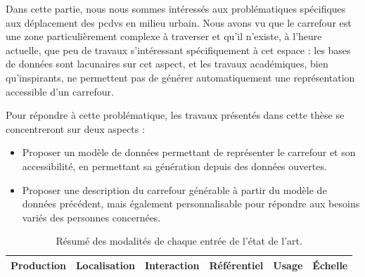 
Dans cette partie, nous nous sommes intéressés aux problématiques spécifiques aux déplacement des \glspl{pcdv} en milieu urbain. Nous avons vu que le carrefour est une zone particulièrement complexe à traverser et qu'il n'existe, à l'heure actuelle, que peu de travaux s'intéressant spécifiquement à cet espace : les bases de données sont lacunaires sur cet aspect, et les travaux académiques, bien qu'inspirants, ne permettent pas de générer automatiquement une représentation accessible d'un carrefour.

Pour répondre à cette problématique, les travaux présentés dans cette thèse se concentreront sur deux aspects :
\begin{itemize}
    \item Proposer un modèle de données permettant de représenter le carrefour et son accessibilité, en permettant sa génération depuis des données ouvertes.
    \item Proposer une description du carrefour générable à partir du modèle de données précédent, mais également personnalisable pour répondre aux besoins variés des personnes concernées.
\end{itemize}


\begin{table}
\begin{center}
\scriptsize
\begin{tabular}{ | l | l | l | l | l | l | }
    Production & Localisation & Interaction & Référentiel & Usage & Échelle \tabularnewline
    \hline
\end{tabular}
\end{center}
\caption{Résumé des modalités de chaque entrée de l'état de l'art.}
\label{tab:ea_resume}
\end{table}
